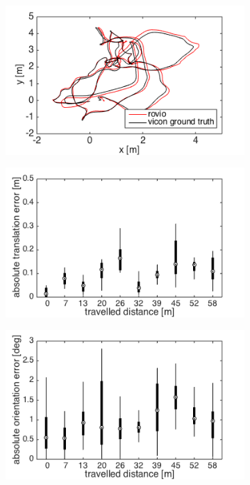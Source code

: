\begin{figure}[h]
  \begin{subfigure}[b]{0.45\textwidth}
    \includegraphics[width=\textwidth]{images/euroc/2D.png}
    \caption{}
  \end{subfigure}
  \hfill
  \begin{subfigure}[b]{0.45\textwidth}
    \includegraphics[width=\textwidth]{images/euroc/ate.png}
    \caption{}
  \end{subfigure}
  \begin{subfigure}[b]{0.45\textwidth}
    \includegraphics[width=\textwidth]{images/euroc/aoe.png}

\end{subfigure}
\end{figure}
